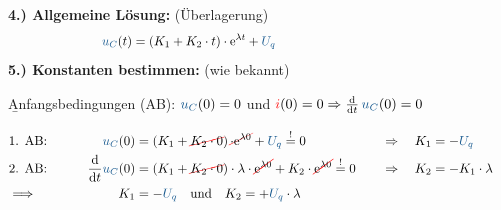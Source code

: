 \begin{frame}\ftx{\subsubsecname}%
    \textbf{4.) Allgemeine Lösung:} (Überlagerung)%
    \begin{align}
        &&
            \ecv{u_C}(t) &= \left( K_1 + K_2 \cdot t \right) \cdot \mathrm{e}^{\lambda t} + \ecv{U_q} \nonumber\\[-14pt]
        &\hphantom{1Rooooooo}&\hphantom{2Loooooo}&\hphantom{2Roooooooooooooooooooooooooooooooooo}&\hphantom{3Loooooo}&\hphantom{3Roooooooooo} \nonumber %
    \end{align}
    \textbf{5.) Konstanten bestimmen:} (wie bekannt)

    \b{\vspace{4pt}Anfangsbedingungen (AB): $\ecv{u_C}(0)=0$ und $\eci{i}(0)=0 \Rightarrow \frac{\mathrm{d}}{\mathrm{d}t}\, \ecv{u_C}(0) = 0 $}

    \begin{align*}
        &\hphantom{1Rooooooo}&\hphantom{2Loooooo}&\hphantom{2Roooooooooooooooooooooooooooooooooo}&\hphantom{3Loooooo}&\hphantom{3Roooooooooo}\\[-15pt] %
        &\text{1. AB:}&
            \ecv{u_C}(0) &= \left( K_1 + \redcancel{K_2 \cdot 0 }\right) \redcancel{\cdot \mathrm{e}^{\lambda 0}} + \ecv{U_q} \overset{!}{=} 0 & \Rightarrow\quad K_1 &= -\ecv{U_q}\\
        &\text{2. AB:}&
            \frac{\mathrm{d}}{\mathrm{d}t} \ecv{u_C}(0) &= \left( K_1 + \redcancel{K_2 \cdot 0} \right) \cdot \lambda \cdot \redcancel{\mathrm{e}^{\lambda 0}} + K_2 \cdot \redcancel{\mathrm{e}^{\lambda 0}} \overset{!}{=} 0 & \Rightarrow\quad K_2 &= -K_1 \cdot \lambda \nonumber\\
            &\Longrightarrow&
        K_1 &= -\ecv{U_q} \quad\text{und}\quad
                K_2 = +\ecv{U_q} \cdot \lambda
    \end{align*}%
\end{frame}

